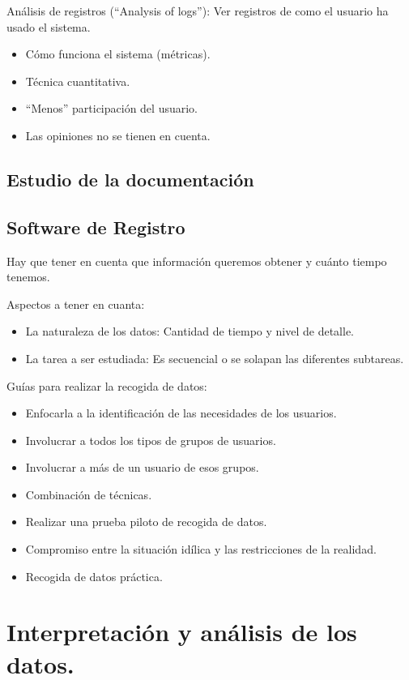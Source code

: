 \documentclass[12pt, twoside, openright]{report} %
\begin{document}
Análisis de registros (``Analysis of logs''): Ver registros de
como el usuario ha usado el sistema.

\begin{itemize}
	\item Cómo funciona el sistema (métricas).
	\item Técnica cuantitativa.
	\item ``Menos'' participación del usuario.
	\item Las opiniones no se tienen en cuenta.
\end{itemize}

\subsection{Estudio de la documentación}
\subsection{Software de Registro}
\pagebreak
Hay que tener en cuenta que información queremos obtener y cuánto
tiempo tenemos.

Aspectos a tener en cuanta:

\begin{itemize}
	\item La naturaleza de los datos: Cantidad de tiempo y nivel de detalle.
	\item La tarea a ser estudiada: Es secuencial o se solapan las
	      diferentes subtareas.
\end{itemize}

Guías para realizar la recogida de datos:

\begin{itemize}
	\item Enfocarla a la identificación de las necesidades de los usuarios.
	\item Involucrar a todos los tipos de grupos de usuarios.
	\item Involucrar a más de un usuario de esos grupos.
	\item Combinación de técnicas.
	\item Realizar una prueba piloto de recogida de datos.
	\item Compromiso entre la situación idílica y las restricciones de la
	      realidad.
	\item Recogida de datos práctica.
\end{itemize}


\section{Interpretación y análisis de los datos.}
\end{document}
